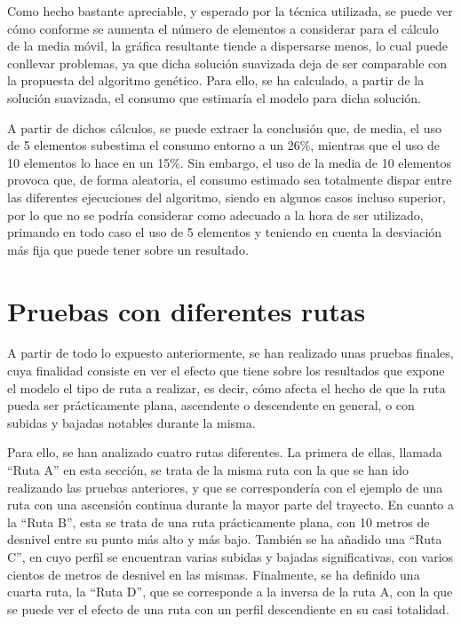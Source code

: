 \documentclass[11pt,spanish,listoffigures,listoftables]{tfgetsinf}
\begin{document}
Como hecho bastante apreciable, y esperado por la técnica utilizada, se puede ver cómo conforme se aumenta el número de elementos a considerar para el cálculo de la media móvil, la gráfica resultante tiende a dispersarse menos, lo cual puede conllevar problemas, ya que dicha solución suavizada deja de ser comparable con la propuesta del algoritmo genético. Para ello, se ha calculado, a partir de la solución suavizada, el consumo que estimaría el modelo para dicha solución.

A partir de dichos cálculos, se puede extraer la conclusión que, de media, el uso de 5 elementos subestima el consumo entorno a un 26\%, mientras que el uso de 10 elementos lo hace en un 15\%. Sin embargo, el uso de la media de 10 elementos provoca que, de forma aleatoria, el consumo estimado sea totalmente dispar entre las diferentes ejecuciones del algoritmo, siendo en algunos casos incluso superior, por lo que no se podría considerar como adecuado a la hora de ser utilizado, primando en todo caso el uso de 5 elementos y teniendo en cuenta la desviación más fija que puede tener sobre un resultado.

\newpage
\section{Pruebas con diferentes rutas}
A partir de todo lo expuesto anteriormente, se han realizado unas pruebas finales, cuya finalidad consiste en ver el efecto que tiene sobre los resultados que expone el modelo el tipo de ruta a realizar, es decir, cómo afecta el hecho de que la ruta pueda ser prácticamente plana, ascendente o descendente en general, o con subidas y bajadas notables durante la misma.

Para ello, se han analizado cuatro rutas diferentes. La primera de ellas, llamada ``Ruta A'' en esta sección, se trata de la misma ruta con la que se han ido realizando las pruebas anteriores, y que se correspondería con el ejemplo de una ruta con una ascensión continua durante la mayor parte del trayecto. En cuanto a la ``Ruta B'', esta se trata de una ruta prácticamente plana, con 10 metros de desnivel entre su punto más alto y más bajo. También se ha añadido una ``Ruta C'', en cuyo perfil se encuentran varias subidas y bajadas significativas, con varios cientos de metros de desnivel en las mismas. Finalmente, se ha definido una cuarta ruta, la ``Ruta D'', que se corresponde a la inversa de la ruta A, con la que se puede ver el efecto de una ruta con un perfil descendiente en su casi totalidad.
\end{document}
